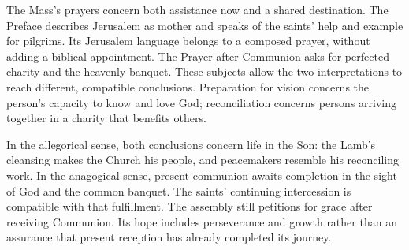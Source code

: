 The Mass's prayers concern both assistance now and a shared destination. The Preface describes Jerusalem as mother and speaks of the saints' help and example for pilgrims. Its Jerusalem language belongs to a composed prayer, without adding a biblical appointment. The Prayer after Communion asks for perfected charity and the heavenly banquet. These subjects allow the two interpretations to reach different, compatible conclusions. Preparation for vision concerns the person's capacity to know and love God; reconciliation concerns persons arriving together in a charity that benefits others.

In the allegorical sense, both conclusions concern life in the Son: the Lamb's cleansing makes the Church his people, and peacemakers resemble his reconciling work. In the anagogical sense, present communion awaits completion in the sight of God and the common banquet. The saints' continuing intercession is compatible with that fulfillment. The assembly still petitions for grace after receiving Communion. Its hope includes perseverance and growth rather than an assurance that present reception has already completed its journey.
